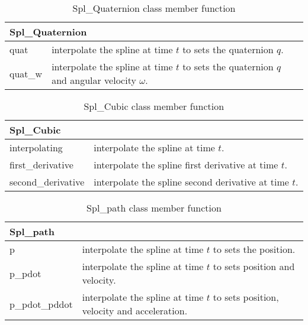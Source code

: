 \documentclass[11pt,fleqn,letterpaper]{report}
\begin{document}
\begin{table}[htbp]
\caption{Spl\_Quaternion class member function}
\label{tab:commandsum1b}
\begin{center}
\begin{tabular}{||l|l||}
\hline
\hline
\multicolumn{2}{||l||}{{\bf Spl\_Quaternion}} \\
\hline
\hline
quat & interpolate the spline at time $t$ to sets the quaternion $q$. \\
\hline
quat\_w & interpolate the spline at time $t$ to sets the quaternion
$q$ and angular velocity $\omega$. \\
\hline
\hline
\end{tabular}
\end{center}
\end{table}

\begin{table}[htbp]
\caption{Spl\_Cubic class member function}
\label{tab:commandsum1c}
\begin{center}
\begin{tabular}{||l|l||}
\hline
\hline
\multicolumn{2}{||l||}{{\bf Spl\_Cubic}} \\
\hline
\hline
interpolating & interpolate the spline at time $t$. \\
\hline
first\_derivative & interpolate the spline first derivative at time $t$. \\
\hline
second\_derivative & interpolate the spline second derivative at time $t$. \\
\hline
\hline
\end{tabular}
\end{center}
\end{table}

\begin{table}[htbp]
\caption{Spl\_path class member function}
\label{tab:commandsum1d}
\begin{center}
\begin{tabular}{||l|l||}
\hline
\hline
\multicolumn{2}{||l||}{{\bf Spl\_path}} \\
\hline
\hline
p & interpolate the spline at time $t$ to sets the position. \\
\hline
p\_pdot & interpolate the spline at time $t$ to sets position and velocity. \\
\hline
p\_pdot\_pddot & interpolate the spline at time $t$ to sets position,
velocity and acceleration. \\
\hline
\hline
\end{tabular}
\end{center}
\end{table}
\end{document}
